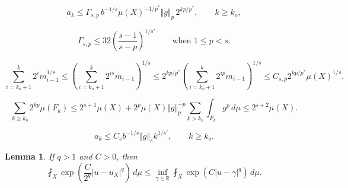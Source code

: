 \documentclass[10pt,a4paper]{amsart}
\newtheorem{lemma}{Lemma}
\newcommand{\bbbr}{\mathbb R}
\begin{document}
\begin{equation}
\label{eq10}
a_k\leq \Gamma_{s,p}\,b^{-1/s}\mu(X)^{-1/p^*}\Vert g\Vert_p\,2^{kp/p^*},
\qquad k\ge k_o,
\end{equation}

\begin{equation}
\label{eq15}
\Gamma_{s,p}\leq 32\left(\frac{s-1}{s-p}\right)^{1/s'}
\qquad
\text{when } 1\leq p<s.
\end{equation}

\begin{equation}
\label{eq39}
\sum_{i=k_o+1}^k2^im_{i-1}^{1/s}
\leq
\left(\sum_{i=k_o+1}^k2^{is}m_{i-1}\right)^{1/s}
\leq
2^{kp/p^*}
\left(\sum_{i=k_o+1}^k2^{ip}m_{i-1}\right)^{1/s}
\leq C_{s,p}2^{kp/p^*}\mu(X)^{1/s}.
\end{equation}

\begin{equation}
\label{eq11}
 \sum_{k\geq k_o}2^{kp}\mu(F_k)
 \leq
2^{s+1}\mu(X)+ 
2^p\mu(X)\Vert g\Vert_p^{-p}
\sum_{k>k_o}\int_{F_k}g^p\,d\mu
 \leq 2^{s+2}\mu(X).
\end{equation}

\begin{equation}
\label{eq12}
 a_k\leq C_s b^{-1/s}\Vert g\Vert_{s} k^{1/s'},
 \qquad k\geq k_o.
\end{equation}

\begin{lemma}
\label{T6}
If $q>1$ and $C>0$, then
\[
\fint_X\exp\left(\frac{C}{2^q}|u-u_X|^q\right)\, d\mu\leq
\inf_{\gamma\in\bbbr}
\fint_X\exp(C|u-\gamma|^q)\, d\mu.
\]
\end{lemma}
\end{document}

